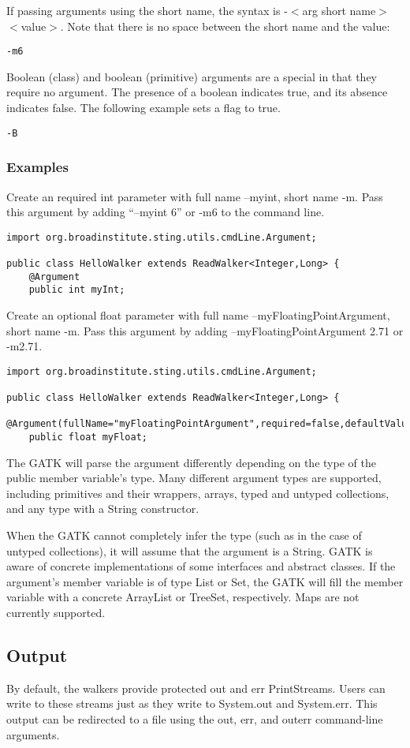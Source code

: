 \documentclass[11pt,fullpage]{article}
\begin{document}
If passing arguments using the short name,
the syntax is -$<$arg short name$>$$<$value$>$.  Note that there is no space
between the short name and the value:
\begin{verbatim}
-m6
\end{verbatim}

Boolean (class) and boolean (primitive) arguments are a special in
that they require no argument.  The presence of a boolean indicates
true, and its absence indicates false.  The following example sets a
flag to true.
\begin{verbatim}
-B

\end{verbatim}

\subsubsection{Examples}

Create an required int parameter with full name --myint, short name
-m.
Pass this argument by adding ``--myint 6'' or -m6 to the command line.
\begin{verbatim}
import org.broadinstitute.sting.utils.cmdLine.Argument;

public class HelloWalker extends ReadWalker<Integer,Long> {
    @Argument
    public int myInt;
\end{verbatim}

Create an optional float parameter with full name
--myFloatingPointArgument, short name -m.  Pass this argument by
adding --myFloatingPointArgument 2.71 or -m2.71.
\begin{verbatim}
import org.broadinstitute.sting.utils.cmdLine.Argument;

public class HelloWalker extends ReadWalker<Integer,Long> {
    @Argument(fullName="myFloatingPointArgument",required=false,defaultValue="3.14159")
    public float myFloat;
\end{verbatim}

The GATK will parse the argument differently depending on the type of
the public member variable's type.  Many different argument types are 
supported, including primitives and their wrappers, arrays, typed and 
untyped collections, and any type with a String constructor.

When the GATK cannot completely infer the type (such as in the case of
untyped collections), it will assume that the argument is a String.
GATK is aware of concrete implementations of some interfaces and
abstract classes.  If the argument's member variable is of type List
or Set, the GATK will fill the member variable with a concrete
ArrayList or TreeSet, respectively.  Maps are not currently supported.

\subsection{Output}
By default, the walkers provide protected out and err PrintStreams.
Users can write to these streams just as they write to System.out and
System.err.  This output can be redirected to a file using the out,
err, and outerr command-line arguments.
\end{document}
